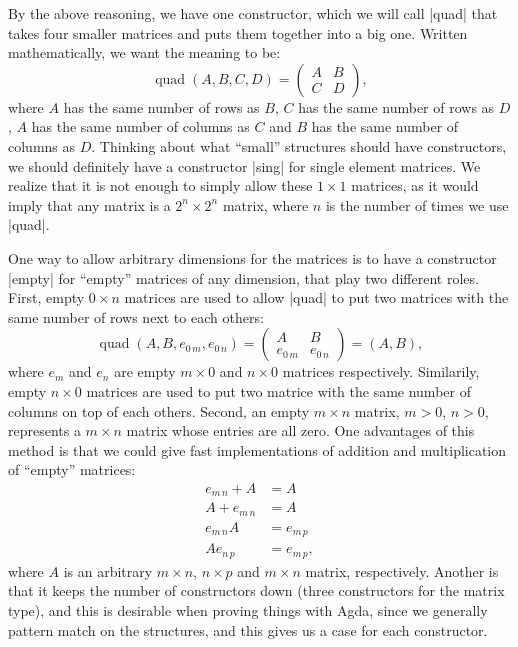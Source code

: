 By the above reasoning, we have one constructor, which we will call |quad| that takes four smaller matrices and puts them together into a big one. Written mathematically, we want the meaning to be:
\begin{equation*}
\operatorname{quad}(A,B,C,D) = 
\begin{pmatrix} 
  A & B \\
  C & D
\end{pmatrix},
\end{equation*}
where $A$ has the same number of rows as $B$, $C$ has the same number of rows as $D$, $A$ has the same number of columns as $C$ and $B$ has the same number of columns as $D$.
Thinking about what ``small'' structures should have constructors, we should definitely have a constructor |sing| for single element matrices. We realize that it is not enough to simply allow these $1 \times 1$ matrices, as it would imply that any matrix is a $2^n \times 2^n$ matrix, where $n$ is the number of times we use |quad|. 

\label{Section:Empty-Matrices}
One way to allow arbitrary dimensions for the matrices is to have a constructor |empty| for ``empty'' matrices of any dimension, that play two different roles. First, empty $0 \times n$ matrices are used to allow |quad| to put two matrices with the same number of rows next to each others:
\begin{equation}
\operatorname{quad}(A, B, e_{0\,m}, e_{0\,n}) =
\begin{pmatrix}
  A & B \\
  e_{0\,m} & e_{0\,n}
\end{pmatrix} = (A,  B),
\end{equation}
where $e_m$ and $e_n$ are empty $m \times 0$ and $n\times 0$ matrices respectively. Similarily, empty $n \times 0$ matrices are used to put two matrice with the same number of columns on top of each others. Second, an empty $m \times n$ matrix, $m > 0$, $n > 0$, represents a $m \times n$ matrix whose entries are all zero. One advantages of this method is that we could give fast implementations of  addition and multiplication of ``empty'' matrices:
\begin{align*}
  e_{m\, n} + A &= A \\ 
  A + e_{m\,n}  &= A \\
  e_{m\, n}   A &= e_{m\,p} \\
  A e_{n\,p}    &= e_{m\,p},
\end{align*}
where $A$ is an arbitrary $m \times n$, $n \times p$ and $m \times n$ matrix, respectively.
Another is that it keeps the number of constructors down (three constructors for the matrix type), and this is desirable when proving things with Agda, since we generally pattern match on the structures, and this gives us a case for each constructor.

